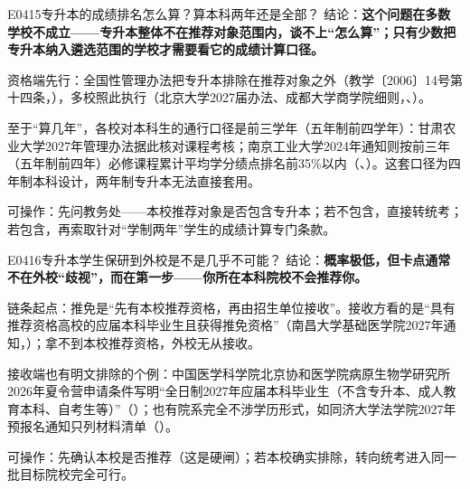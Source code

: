 \begin{qa}{E0415}{专升本的成绩排名怎么算？算本科两年还是全部？}
结论：\textbf{这个问题在多数学校不成立——专升本整体不在推荐对象范围内，谈不上“怎么算”；只有少数把专升本纳入遴选范围的学校才需要看它的成绩计算口径。}

资格端先行：全国性管理办法把专升本排除在推荐对象之外（教学〔2006〕14号第十四条，），多校照此执行（北京大学2027届办法、成都大学商学院细则，、）。

至于“算几年”，各校对本科生的通行口径是前三学年（五年制前四学年）：甘肃农业大学2027年管理办法据此核对课程考核；南京工业大学2024年通知则按前三年（五年制前四年）必修课程累计平均学分绩点排名前35\%以内（、）。这套口径为四年制本科设计，两年制专升本无法直接套用。

可操作：先问教务处——本校推荐对象是否包含专升本；若不包含，直接转统考；若包含，再索取针对“学制两年”学生的成绩计算专门条款。
\end{qa}

\begin{qa}{E0416}{专升本学生保研到外校是不是几乎不可能？}
结论：\textbf{概率极低，但卡点通常不在外校“歧视”，而在第一步——你所在本科院校不会推荐你。}

链条起点：推免是“先有本校推荐资格，再由招生单位接收”。接收方看的是“具有推荐资格高校的应届本科毕业生且获得推免资格”（南昌大学基础医学院2027年通知，）；拿不到本校推荐资格，外校无从接收。

接收端也有明文排除的个例：中国医学科学院北京协和医学院病原生物学研究所2026年夏令营申请条件写明“全日制2027年应届本科毕业生（不含专升本、成人教育本科、自考生等）”（）；也有院系完全不涉学历形式，如同济大学法学院2027年预报名通知只列材料清单（）。

可操作：先确认本校是否推荐（这是硬闸）；若本校确实排除，转向统考进入同一批目标院校完全可行。
\end{qa}

